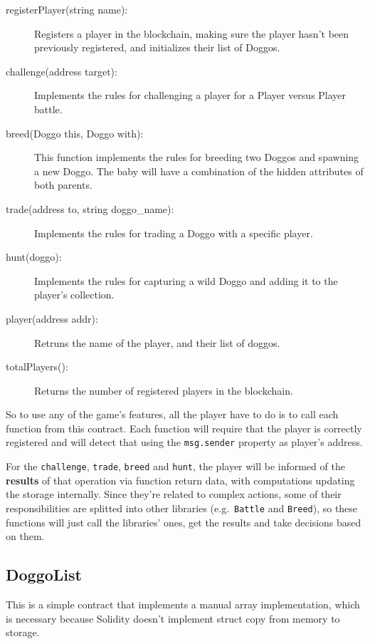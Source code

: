 \documentclass{article}
\begin{document}
    \begin{description}
        \item[registerPlayer(string name):] Registers a player in the
            blockchain, making sure the player hasn't been previously
            registered, and initializes their list of Doggos.
        \item[challenge(address target):] Implements the rules for challenging
            a player for a Player versus Player battle.
        \item[breed(Doggo this, Doggo with):] This function implements the
            rules for breeding two Doggos and spawning a new Doggo. The baby
            will have a combination of the hidden attributes of both parents.
        \item[trade(address to, string doggo\_name):] Implements the rules for
            trading a Doggo with a specific player.
        \item[hunt(doggo):] Implements the rules for capturing a wild Doggo and
            adding it to the player's collection.
        \item[player(address addr):] Retruns the name of the player, and their
            list of doggos.
        \item[totalPlayers():] Returns the number of registered players in the
            blockchain.
    \end{description}

    So to use any of the game's features, all the player have to do is to call
    each function from this contract. Each function will require that the
    player is correctly registered and will detect that using the
    \texttt{msg.sender} property as player's address.

    For the \texttt{challenge}, \texttt{trade}, \texttt{breed} and
    \texttt{hunt}, the player will be informed of the \textbf{results} of that
    operation via function return data, with computations updating the storage
    internally. Since they're related to complex actions, some of their
    responsibilities are splitted into other libraries (e.g.\ \texttt{Battle}
    and \texttt{Breed}), so these functions will just call the libraries' ones,
    get the results and take decisions based on them.

    \subsection{DoggoList}

    This is a simple contract that implements a manual array implementation,
    which is necessary because Solidity doesn't implement struct copy from
    memory to storage.
\end{document}

